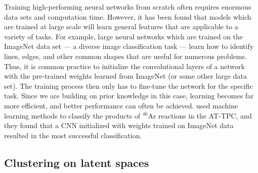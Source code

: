\documentclass[preprint,12pt]{elsarticle}
\begin{document}


Training high-performing neural networks from scratch often requires enormous data sets and computation time. However, it has been found that models which are trained at large scale will learn general features that are applicable to a variety of tasks. For example, large neural networks which are trained on the ImageNet data set \cite{deng2009imagenet} --- a diverse image classification task --- learn how to identify lines, edges, and other common shapes that are useful for numerous problems. Thus, it is common practice to initialize the convolutional layers of a network with the pre-trained weights learned from ImageNet (or some other large data set). The training process then only has to fine-tune the network for the specific task. Since we are building on prior knowledge in this case, learning becomes far more efficient, and better performance can often be achieved. \citet{Kuchera2019} used machine learning methods to classify the products of $^{46}$Ar reactions in the AT-TPC, and they found that a CNN initialized with weights trained on ImageNet data resulted in the most successful classification.

\subsection{Clustering on latent spaces}

\end{document}
